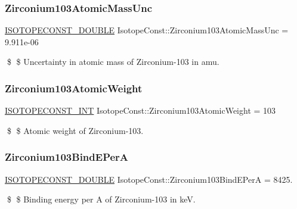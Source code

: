 \subsubsection{\texorpdfstring{Zirconium103\+Atomic\+Mass\+Unc}{Zirconium103AtomicMassUnc}}
{\footnotesize\ttfamily \mbox{\hyperlink{group___isotope_const-_macros_ga8f45a7272ce02c0b4c65c44636ed719a}{I\+S\+O\+T\+O\+P\+E\+C\+O\+N\+S\+T\+\_\+\+D\+O\+U\+B\+LE}} Isotope\+Const\+::\+Zirconium103\+Atomic\+Mass\+Unc = 9.\+911e-\/06}

\$ \$ Uncertainty in atomic mass of Zirconium-\/103 in amu. \mbox{\label{group___isotope_const-_zirconium-_zr103_gaa7d4d8238d6399e00438c561988d05a8}} 
\subsubsection{\texorpdfstring{Zirconium103\+Atomic\+Weight}{Zirconium103AtomicWeight}}
{\footnotesize\ttfamily \mbox{\hyperlink{group___isotope_const-_macros_ga5f18360b3e99483a35c32d789e62621c}{I\+S\+O\+T\+O\+P\+E\+C\+O\+N\+S\+T\+\_\+\+I\+NT}} Isotope\+Const\+::\+Zirconium103\+Atomic\+Weight = 103}

\$ \$ Atomic weight of Zirconium-\/103. \mbox{\label{group___isotope_const-_zirconium-_zr103_ga5c35c42290a7c03660edef94a388ff4d}} 
\subsubsection{\texorpdfstring{Zirconium103\+Bind\+E\+PerA}{Zirconium103BindEPerA}}
{\footnotesize\ttfamily \mbox{\hyperlink{group___isotope_const-_macros_ga8f45a7272ce02c0b4c65c44636ed719a}{I\+S\+O\+T\+O\+P\+E\+C\+O\+N\+S\+T\+\_\+\+D\+O\+U\+B\+LE}} Isotope\+Const\+::\+Zirconium103\+Bind\+E\+PerA = 8425.}

\$ \$ Binding energy per A of Zirconium-\/103 in keV. \mbox{\label{group___isotope_const-_zirconium-_zr103_gab8d7dd99cc0bf285648cc73eb73d808d}} 
